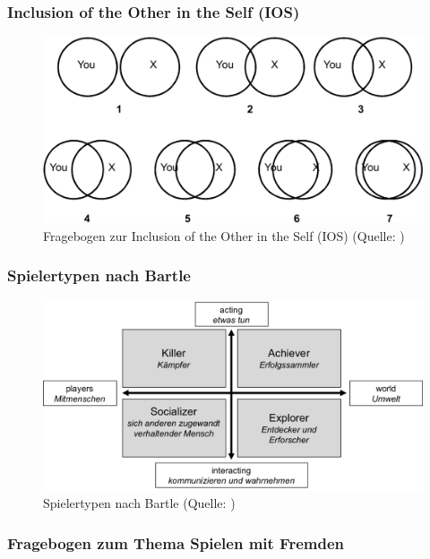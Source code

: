 \documentclass[
	12pt,
	a4paper,
	bibtotoc,
	cleardoubleempty, 
	idxtotoc,
	ngerman,
	openright
	final,
	listof=nochaptergap,
	]{scrbook}
\begin{document}
\begin{appendices}
\subsubsection{Inclusion of the Other in the Self (IOS)}


\begin{figure}[ht]
\centering
\includegraphics[width=1\linewidth]{content/attachments/questtionaires/IOS.png}
\caption{Fragebogen zur Inclusion of the Other in the Self (IOS) (Quelle: \citealp{gachter_measuring_2015})}
\label{fig:append_ios}
\end{figure}



\subsubsection{Spielertypen nach Bartle}


\begin{figure}[ht]
\centering
\includegraphics[width=1\linewidth]{content/attachments/questtionaires/bartle-spielertypenbrell-1024x512.png}
\caption{Spielertypen nach Bartle (Quelle: \citealp{bartle_hearts_1996})}
\label{fig:append_bartle}
\end{figure}

\subsubsection{Fragebogen zum Thema Spielen mit Fremden}




\end{appendices}
\end{document}
